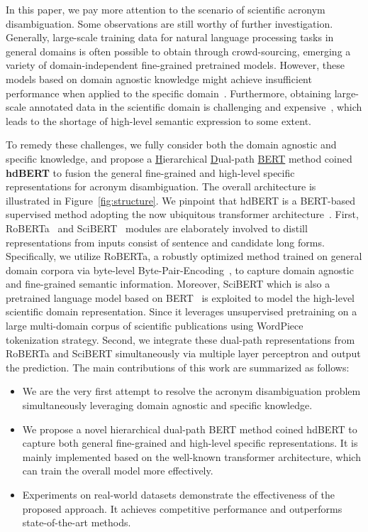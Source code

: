 In this paper, we pay more attention to the scenario of scientific acronym disambiguation.
Some observations are still worthy of further investigation.
Generally, large-scale training data for natural language processing tasks in general domains is often possible to obtain through crowd-sourcing, emerging a variety of domain-independent fine-grained pretrained models.
However, these models based on domain agnostic knowledge might achieve insufficient performance when applied to the specific domain~\cite{Beltagy2019SciBERT}.
Furthermore, obtaining large-scale annotated data in the scientific domain is challenging and expensive~\cite{Beltagy2019SciBERT}, which leads to the shortage of high-level semantic expression to some extent.

To remedy these challenges, we fully consider both the domain agnostic and specific knowledge, and propose a \underline{H}ierarchical \underline{D}ual-path \underline{BERT} method coined \textbf{hdBERT} to fusion the general fine-grained and high-level specific representations for acronym disambiguation.
The overall architecture is illustrated in Figure~\ref{fig:structure}.
We pinpoint that hdBERT is a BERT-based supervised method adopting the now ubiquitous transformer architecture~\cite{vaswani2017attention}.
First, RoBERTa~\cite{liu2019roberta} and SciBERT~\cite{Beltagy2019SciBERT} modules are elaborately involved to distill representations from inputs consist of sentence and candidate long forms.
Specifically, we utilize RoBERTa, a robustly optimized method trained on general domain corpora via byte-level Byte-Pair-Encoding~\cite{sennrich2016neural}, to capture domain agnostic and fine-grained semantic information.
Moreover, SciBERT which is also a pretrained language model based on BERT~\cite{devlin2018bert} is exploited to model the high-level scientific domain representation.
Since it leverages unsupervised pretraining on a large multi-domain corpus of scientific publications using WordPiece~\cite{wu2016google} tokenization strategy.
Second, we integrate these dual-path representations from RoBERTa and SciBERT simultaneously via multiple layer perceptron and output the prediction. %
The main contributions of this work are summarized as follows:
\begin{itemize}
	\item We are the very first attempt to resolve the acronym disambiguation problem simultaneously leveraging domain agnostic and specific knowledge.
	\item We propose a novel hierarchical dual-path BERT method coined hdBERT to capture both general fine-grained and high-level specific representations. It is mainly implemented based on the well-known transformer architecture, which can train the overall model more effectively.
	\item Experiments on real-world datasets demonstrate the effectiveness of the proposed approach. It achieves competitive performance and outperforms state-of-the-art methods.
\end{itemize}



